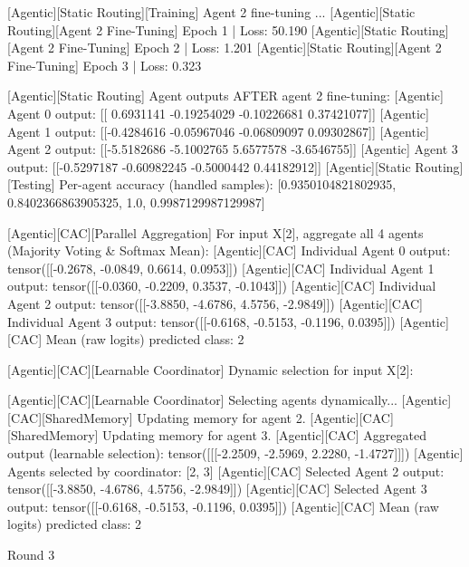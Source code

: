 [Agentic][Static Routing][Training] Agent 2 fine-tuning ...
[Agentic][Static Routing][Agent 2 Fine-Tuning] Epoch 1 | Loss: 50.190
[Agentic][Static Routing][Agent 2 Fine-Tuning] Epoch 2 | Loss: 1.201
[Agentic][Static Routing][Agent 2 Fine-Tuning] Epoch 3 | Loss: 0.323

[Agentic][Static Routing] Agent outputs AFTER agent 2 fine-tuning:
[Agentic] Agent 0 output: [[ 0.6931141  -0.19254029 -0.10226681  0.37421077]]
[Agentic] Agent 1 output: [[-0.4284616  -0.05967046 -0.06809097  0.09302867]]
[Agentic] Agent 2 output: [[-5.5182686 -5.1002765  5.6577578 -3.6546755]]
[Agentic] Agent 3 output: [[-0.5297187  -0.60982245 -0.5000442   0.44182912]]
[Agentic][Static Routing][Testing] Per-agent accuracy (handled samples): [0.9350104821802935, 0.8402366863905325, 1.0, 0.9987129987129987]

[Agentic][CAC][Parallel Aggregation] For input X[2], aggregate all 4 agents (Majority Voting & Softmax Mean):
[Agentic][CAC] Individual Agent 0 output: tensor([[-0.2678, -0.0849,  0.6614,  0.0953]])
[Agentic][CAC] Individual Agent 1 output: tensor([[-0.0360, -0.2209,  0.3537, -0.1043]])
[Agentic][CAC] Individual Agent 2 output: tensor([[-3.8850, -4.6786,  4.5756, -2.9849]])
[Agentic][CAC] Individual Agent 3 output: tensor([[-0.6168, -0.5153, -0.1196,  0.0395]])
[Agentic][CAC] Mean (raw logits) predicted class: 2

[Agentic][CAC][Learnable Coordinator] Dynamic selection for input X[2]:

[Agentic][CAC][Learnable Coordinator] Selecting agents dynamically...
[Agentic][CAC][SharedMemory] Updating memory for agent 2.
[Agentic][CAC][SharedMemory] Updating memory for agent 3.
[Agentic][CAC] Aggregated output (learnable selection): tensor([[[-2.2509, -2.5969,  2.2280, -1.4727]]])
[Agentic] Agents selected by coordinator: [2, 3]
[Agentic][CAC] Selected Agent 2 output: tensor([[-3.8850, -4.6786,  4.5756, -2.9849]])
[Agentic][CAC] Selected Agent 3 output: tensor([[-0.6168, -0.5153, -0.1196,  0.0395]])
[Agentic][CAC] Mean (raw logits) predicted class: 2

Round 3

